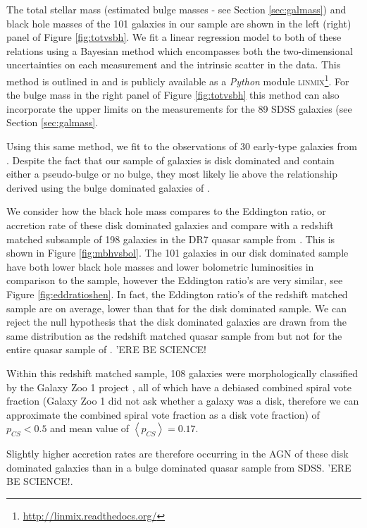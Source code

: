  
The total stellar mass (estimated bulge masses - see Section \ref{sec:galmass}) and black hole masses of the 101 galaxies in our sample are shown in the left (right) panel of Figure \ref{fig:totvsbh}. We fit a linear regression model to both of these relations using a Bayesian method which encompasses both the two-dimensional uncertainties on each measurement and the intrinsic scatter in the data. This method is outlined in \citet{kelly07} and is publicly available as a \emph{Python} module \textsc{linmix}\footnote{\url{http://linmix.readthedocs.org/}}. For the bulge mass in the right panel of Figure \ref{fig:totvsbh} this method can also incorporate the upper limits on the measurements for the 89 SDSS galaxies (see Section \ref{sec:galmass}. 

Using this same method, we fit to the observations of 30 early-type galaxies from \citet{haringrix04}. Despite the fact that our sample of galaxies is disk dominated and contain either a pseudo-bulge or no bulge, they most likely lie above the relationship derived using the bulge dominated galaxies of \citet{haringrix04}. 

We consider how the black hole mass compares to the Eddington ratio, or accretion rate of these disk dominated galaxies and compare with a redshift matched subsample of 198 galaxies in the DR7 quasar sample from \citet{shen11}. This is shown in Figure \ref{fig:mbhvsbol}. The 101 galaxies in our disk dominated sample have both lower black hole masses and lower bolometric luminosities in comparison to the \citet{shen11} sample, however the Eddington ratio's are very similar, see Figure \ref{fig:eddratioshen}. In fact, the Eddington ratio's of the redshift matched sample are on average, lower than that for the disk dominated sample. We can reject the null hypothesis that the disk dominated galaxies are drawn from the same distribution as the redshift matched quasar sample from \citet{shen11} but not for the entire quasar sample of \citet{shen11}. {\notebsm 'ERE BE SCIENCE!}

Within this redshift matched sample, 108 galaxies were morphologically classified by the Galaxy Zoo 1 project \cite{lintott08, lintott11}, all of which have a debiased combined spiral vote fraction (Galaxy Zoo 1 did not ask whether a galaxy was a disk, therefore we can approximate the combined spiral vote fraction as a disk vote fraction) of $p_{CS} < 0.5$ and mean value of $\left<p_{CS} \right> = 0.17$. 

Slightly higher accretion rates are therefore occurring in the AGN of these disk dominated galaxies than in a bulge dominated quasar sample from SDSS. {\notebsm 'ERE BE SCIENCE!}. 

